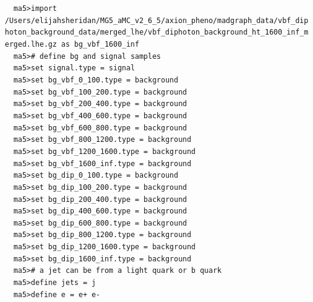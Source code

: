 \documentclass[a4paper, 10pt]{article}
\begin{document}
\texttt{ }\texttt{ }\texttt{ma5>import /\-Users/\-elijahsheridan/\-MG5\_aMC\_v2\_6\_5/\-axion\_pheno/\-madgraph\_data/\-vbf\_diphoton\_background\_data/\-merged\_lhe/\-vbf\_diphoton\_background\_ht\_1600\_inf\_merged.lhe.gz as bg\_vbf\_1600\_inf\\
}
\texttt{ }\texttt{ }\texttt{ma5>\# define bg and signal samples\\
}
\texttt{ }\texttt{ }\texttt{ma5>set signal.type = signal\\
}
\texttt{ }\texttt{ }\texttt{ma5>set bg\_vbf\_0\_100.type = background\\
}
\texttt{ }\texttt{ }\texttt{ma5>set bg\_vbf\_100\_200.type = background\\
}
\texttt{ }\texttt{ }\texttt{ma5>set bg\_vbf\_200\_400.type  = background\\
}
\texttt{ }\texttt{ }\texttt{ma5>set bg\_vbf\_400\_600.type  = background\\
}
\texttt{ }\texttt{ }\texttt{ma5>set bg\_vbf\_600\_800.type  = background\\
}
\texttt{ }\texttt{ }\texttt{ma5>set bg\_vbf\_800\_1200.type  = background\\
}
\texttt{ }\texttt{ }\texttt{ma5>set bg\_vbf\_1200\_1600.type  = background\\
}
\texttt{ }\texttt{ }\texttt{ma5>set bg\_vbf\_1600\_inf.type = background\\
}
\texttt{ }\texttt{ }\texttt{ma5>set bg\_dip\_0\_100.type = background\\
}
\texttt{ }\texttt{ }\texttt{ma5>set bg\_dip\_100\_200.type = background\\
}
\texttt{ }\texttt{ }\texttt{ma5>set bg\_dip\_200\_400.type = background\\
}
\texttt{ }\texttt{ }\texttt{ma5>set bg\_dip\_400\_600.type = background\\
}
\texttt{ }\texttt{ }\texttt{ma5>set bg\_dip\_600\_800.type = background\\
}
\texttt{ }\texttt{ }\texttt{ma5>set bg\_dip\_800\_1200.type = background\\
}
\texttt{ }\texttt{ }\texttt{ma5>set bg\_dip\_1200\_1600.type = background\\
}
\texttt{ }\texttt{ }\texttt{ma5>set bg\_dip\_1600\_inf.type = background\\
}
\texttt{ }\texttt{ }\texttt{ma5>\# a jet can be from a light quark or b quark\\
}
\texttt{ }\texttt{ }\texttt{ma5>define jets = j\\
}
\texttt{ }\texttt{ }\texttt{ma5>define e = e+ e-\\
}
\end{document}
